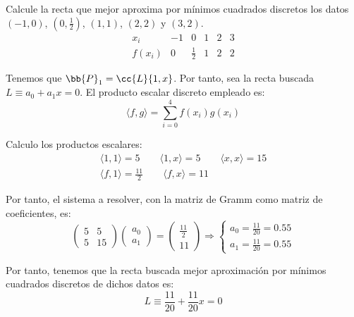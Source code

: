 \begin{ejercicio} Calcule la recta que mejor aproxima por mínimos cuadrados discretos los datos $(-1,0)$, $\left(0, \frac{1}{2}\right)$, $(1,1)$, $(2,2)$ y $(3,2)$.
    \begin{equation*}
        \begin{array}{c|ccccc}
            x_i & -1 & 0 & 1 & 2 & 3 \\ \hline
            f(x_i) & 0 & \frac{1}{2} & 1 & 2 & 2
        \end{array}
    \end{equation*}
    
    Tenemos que $\bb{P}_1=\cc{L}\{1,x\}$. Por tanto, sea la recta buscada $L\equiv a_0+a_1x=0$. El producto escalar discreto empleado es:
    \begin{equation*}
        \langle f,g\rangle = \sum_{i=0}^4 f(x_i)g(x_i)
    \end{equation*}

    Calculo los productos escalares:
    \begin{gather*}
        \langle 1,1 \rangle = 5
        \qquad
        \langle 1,x \rangle = 5
        \qquad
        \langle x,x \rangle = 15
        \\
        \langle f,1\rangle = \frac{11}{2}
        \qquad
        \langle f,x \rangle = 11
    \end{gather*}

    Por tanto, el sistema a resolver, con la matriz de Gramm como matriz de coeficientes, es:
    \begin{equation*}
        \left(\begin{array}{cc}
            5 & 5 \\
            5 & 15
        \end{array}\right)
        \left(\begin{array}{c}
            a_0 \\ a_1    
        \end{array}\right)
        = 
        \left(\begin{array}{c}
            \frac{11}{2} \\ 11    
        \end{array}\right)
        \Longrightarrow
        \left\{\begin{array}{c}
            a_0 = \frac{11}{20} = 0.55  \\
            a_1 = \frac{11}{20} = 0.55
        \end{array}\right.
    \end{equation*}

    Por tanto, tenemos que la recta buscada mejor aproximación por mínimos cuadrados discretos de dichos datos es:
    \begin{equation*}
        L\equiv \frac{11}{20} + \frac{11}{20}x=0
    \end{equation*}

\end{ejercicio}


